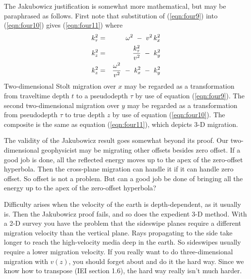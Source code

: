 {\par
The Jakubowicz justification is somewhat more mathematical,
but may be paraphrased as follows.
First note that substitution of (\ref{eqn:four9}) into (\ref{eqn:four10})
gives (\ref{eqn:four11}) where
\begin{eqnarray}
k_{\tau}^2 &=& \omega^2  \ -\  v^2 \, k_x^2
\label{eqn:four9}
\\
k_z^2 &=& {k_{\tau}^2  \over v^2} \ -\  k_y^2
\label{eqn:four10}
\\
k_z^2 &=& {\omega^2  \over v^2}
\ -\  k_x^2
\ -\  k_y^2
\label{eqn:four11}
\end{eqnarray}
Two-dimensional Stolt migration over  $x$  may be regarded 
as a transformation from traveltime depth  $t$  to a pseudodepth  $\tau$  by
use of equation (\ref{eqn:four9}).
The second two-dimensional migration over  $y$  may be regarded
as a transformation from pseudodepth  $\tau$  to true depth  $z$ by
use of equation (\ref{eqn:four10}).
The composite is the same as equation (\ref{eqn:four11}),
which depicts 3-D migration.
\par
The validity of the Jakubowicz result
goes somewhat beyond its proof.
Our two-dimensional geophysicist may be
migrating other offsets besides zero offset.
If a good job is done, all the reflected energy moves up
to the apex of the zero-offset hyperbola.
Then the cross-plane migration can handle it if it can handle zero offset.
So offset is not a problem.
But can a good job be done of bringing all the energy up to the apex
of the zero-offset hyperbola?
\par
Difficulty arises when the velocity of the earth is depth-dependent,
as it usually is.
Then the Jakubowicz proof fails, and so does the expedient 3-D method.
With a 2-D survey you have the problem that the sideswipe planes
require a different migration velocity than the vertical plane.
Rays propagating to the side take longer to reach the high-velocity
media deep in the earth.
So sideswipes usually require a lower migration velocity.
If you really want to do three-dimensional migration with  $v(z)$,
you should forget about  and do it the hard way.
Since we know how to transpose (IEI section 1.6),
the hard way really isn't much harder.
}
